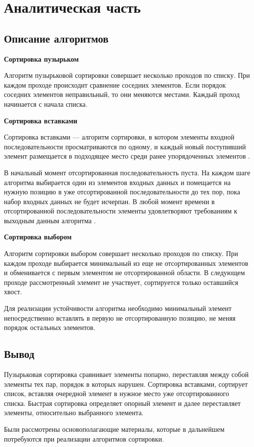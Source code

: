 \chapter{Аналитическая часть}

\section{Описание алгоритмов}

\textbf{Сортировка пузырьком}

Алгоритм пузырьковой сортировки совершает несколько проходов по списку. 
При каждом проходе происходит сравнение соседних элементов. Если порядок соседних элементов неправильный, то они меняются местами. Каждый проход начинается с начала списка.

\textbf{Сортировка вставками}

Сортировка вставками — алгоритм сортировки, в котором элементы входной последовательности просматриваются по одному, и каждый новый поступивший элемент размещается в подходящее место среди ранее упорядоченных элементов \cite{knut}.

В начальный момент отсортированная последовательность пуста. На каждом шаге алгоритма выбирается один из элементов входных данных и помещается на нужную позицию в уже отсортированной последовательности до тех пор, пока набор входных данных не будет исчерпан. В любой момент времени в отсортированной последовательности элементы удовлетворяют требованиям к выходным данным алгоритма \cite{kormen}.

\textbf{Сортировка выбором}

Алгоритм сортировки выбором совершает несколько проходов по списку. При каждом проходе выбирается минимальный из еще не отсортированных элементов и обменивается с первым элементом не отсортированной области. В следующем проходе рассмотренный элемент не участвует, сортируется только оставшийся хвост.

Для реализации устойчивости алгоритма необходимо минимальный элемент непосредственно вставлять в первую не отсортированную позицию, не меняя порядок остальных элементов.

\section{Вывод}

Пузырьковая сортировка сравнивает элементы попарно, переставляя между собой элементы тех пар, порядок в которых нарушен.
Сортировка вставками, сортирует список, вставляя очередной элемент в нужное место уже отсортированного списка.
Быстрая сортировка определяет опорный элемент и далее переставляет элементы, относительно выбранного элемента.

Были рассмотрены основополагающие материалы, которые в дальнейшем потребуются при реализации алгоритмов сортировки. 